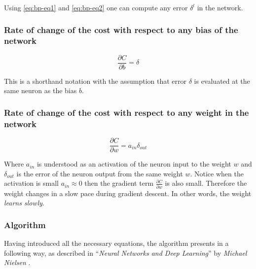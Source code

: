 Using \ref{eq:bp-eq1} and \ref{eq:bp-eq2} one can compute any error $\delta^l$ in the network.

\subsubsection*{Rate of change of the cost with respect to any bias of the network}
\label{sub2:rate-of-change-of-the-cost-with-respect-to-every-bias-of-the-network}

\begin{equation}
    \frac{\partial C}{\partial b} = \delta
    \tag{EQ3}
    \label{eq:bp-eq3}
\end{equation}

This is a shorthand notation with the assumption that error $\delta$ is evaluated at the same neuron as the bias $b$.

\subsubsection*{Rate of change of the cost with respect to any weight in the network}
\label{sub2:rate-of-change-of-the-cost-with-respect-to-any-weight-in-the-network}

\begin{equation}
    \frac{\partial C}{\partial w} = a_{in} \delta_{out}
    \tag{EQ4}
    \label{eq:bp-eq4}
\end{equation}

Where $a_{in}$ is understood as an activation of the neuron input to the weight $w$ and $\delta_{out}$ is the error of the neuron output from the same weight $w$. Notice when the activation is small $a_{in} \approx 0$ then the gradient term $\frac{\partial C}{\partial w}$ is also small. Therefore the weight changes in a slow pace during gradient descent. In other words, the weight \emph{learns slowly}.


\subsubsection*{Algorithm}
\label{sub2:bp-algorithm}

Having introduced all the necessary equations, the algorithm presents in a following way, as described in ``\emph{Neural Networks and Deep Learning}'' by \emph{Michael Nielsen} \cite{NNandDL}.

